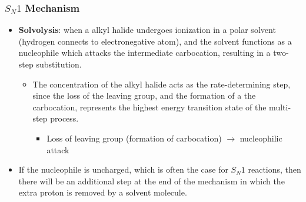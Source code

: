 \documentclass[12pt,a4paper]{article}
\begin{document}
\subsubsection{\texorpdfstring{\(S_N1\) Mechanism}{Lg}}
    \begin{itemize}
        \item \textbf{Solvolysis}: when a alkyl halide undergoes ionization in a polar solvent (hydrogen connects to electronegative atom), and the solvent functions as a {\color{o-Sun}nucleophile} which attacks the intermediate carbocation, resulting in a two-step substitution.
            \begin{itemize}
                \item The concentration of the {\color{o-Sun}alkyl halide} acts as the {\color{o-Sun}rate-determining} step, since the loss of the leaving group, and the formation of a the carbocation, represents the highest energy transition state of the multi-step process.
                    \begin{itemize}
                        \item Loss of leaving group (formation of carbocation) $\rightarrow$ nucleophilic attack
                    \end{itemize}
            \end{itemize}
        \item If the nucleophile is uncharged, which is often the case for \(S_N1\) reactions, then there will be an additional step at the end of the mechanism in which the extra proton is removed by a solvent molecule.
    \end{itemize}
\end{document}

